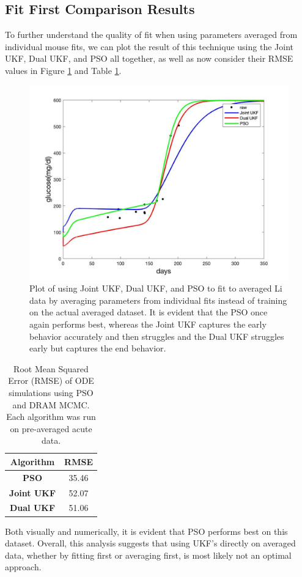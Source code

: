 \documentclass{article}
\begin{document}
\subsection{Fit First Comparison Results}
To further understand the quality of fit when using parameters averaged from individual mouse fits, we can plot the result of this technique using the Joint UKF, Dual UKF, and PSO all together, as well as now consider their RMSE values in Figure \ref{fig:Results_FitFirst_Comparison} and Table \ref{table:Results_FitFirst_RMSE}.
\begin{figure}[H]
    \centering
    \includegraphics[width=15cm]{Comparison_Figures/Fit_Then_Average_Figure.jpg}
    \caption{Plot of using Joint UKF, Dual UKF, and PSO to fit to averaged Li data by averaging parameters from individual fits instead of training on the actual averaged dataset. It is evident that the PSO once again performs best, whereas the Joint UKF captures the early behavior accurately and then struggles and the Dual UKF struggles early but captures the end behavior.}
    \label{fig:Results_FitFirst_Comparison}
\end{figure} 

\begin{table}[H]
  \begin{center}
    \label{tab:table1}
    \begin{tabular}{c|c} %
      \textbf{Algorithm} & \textbf{RMSE} \\
      \hline
      \textbf{PSO} & 35.46\\
      \textbf{Joint UKF} & 52.07\\
      \textbf{Dual UKF} & 51.06
    \end{tabular}
    \caption{Root Mean Squared Error (RMSE) of ODE simulations using PSO and DRAM MCMC. Each algorithm was run on pre-averaged acute data.}
    \label{table:Results_FitFirst_RMSE}
  \end{center}
\end{table}

Both visually and numerically, it is evident that PSO performs best on this dataset. Overall, this analysis suggests that using UKF's directly on averaged data, whether by fitting first or averaging first, is most likely not an optimal approach. 
\end{document}

